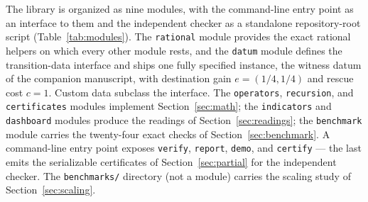 \documentclass[3p,11pt]{elsarticle}
\begin{document}
The library is organized as nine modules, with the command-line
entry point as an interface to them and the independent checker as a
standalone repository-root script (Table~\ref{tab:modules}). The
\texttt{rational} module provides the exact rational helpers on which every
other module rests, and the \texttt{datum} module defines the transition-data interface and ships one
fully specified instance, the witness datum of the companion manuscript,
with destination gain $e = (1/4, 1/4)$ and rescue cost $c = 1$. Custom data
subclass the interface. The \texttt{operators}, \texttt{recursion}, and
\texttt{certificates} modules implement Section~\ref{sec:math}; the
\texttt{indicators} and \texttt{dashboard} modules produce the readings of
Section~\ref{sec:readings}; the \texttt{benchmark} module carries the
twenty-four exact checks of Section~\ref{sec:benchmark}. A command-line
entry point exposes \texttt{verify}, \texttt{report}, \texttt{demo}, and
\texttt{certify} --- the last emits the serializable certificates of
Section~\ref{sec:partial} for the independent checker. The
\texttt{benchmarks/} directory (not a module) carries the scaling study
of Section~\ref{sec:scaling}.
\end{document}
